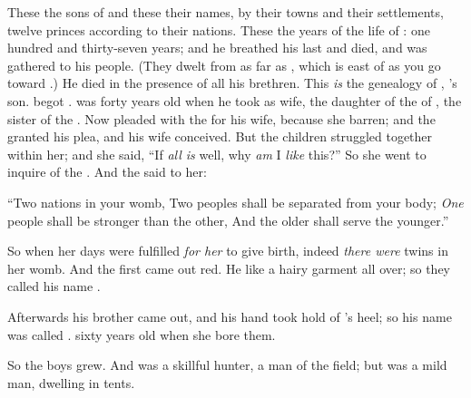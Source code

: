 \bverse These \were the sons of \Ishmael and these \were their names, by their towns and their settlements, twelve princes according to their nations.
\bverse These \were the years of the life of \Ishmael: one hundred and thirty-seven years; and he breathed his last and died, and was gathered to his people.
\bverse (They dwelt from  as far as , which is east of  as you go toward .) He died in the presence of all his brethren.
\bverse This \textit{is} the genealogy of \Isaac, \Abraham's son. \Abraham begot \Isaac. 
\bverse \Isaac was forty years old when he took \Rebekah as wife, the daughter of  the  of \PadanAram, the sister of \Laban the .
\bverse Now \Isaac pleaded with the \lord for his wife, because she \was barren; and the \lord granted his plea, and \Rebekah his wife conceived.
\bverse But the children struggled together within her; and she said, ``If \textit{all is} well, why \textit{am} I \textit{like} this?'' So she went to inquire of the \lord.
\bverse And the \lord said to her:
\begin{bquotation}
``Two nations \are in your womb, Two peoples shall be separated from your body; \textit{One} people shall be stronger than the other, And the older shall serve the younger.''
\end{bquotation}
\bverse So when her days were fulfilled \textit{for her} to give birth, indeed \textit{there were} twins in her womb.
\bverse And the first came out red. He \was like a hairy garment all over; so they called his name \Esau{}.

\bverse Afterwards his brother came out, and his hand took hold of \Esau's heel; so his name was called \Jacob{}. \Isaac \was sixty years old when she bore them.

\bverse So the boys grew. And \Esau was a skillful hunter, a man of the field; but \Jacob was a mild man, dwelling in tents.

